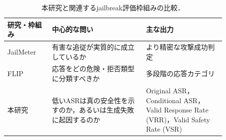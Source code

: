 \documentclass{article}
\begin{document}

\begin{table}[t]
\centering
\caption{本研究と関連するjailbreak評価枠組みの比較．}
\label{tab:comparison_jailbreak_evaluation}
\small
\begin{tabular}{p{0.18\linewidth} p{0.38\linewidth} p{0.32\linewidth}}
\toprule
\textbf{研究・枠組み} & \textbf{中心的な問い} & \textbf{主な出力} \\
\midrule
JailMeter
& 有害な追従が実質的に成立しているか
& より精密な攻撃成功判定 \\
\midrule
FLIP
& 応答をどの危険・拒否類型に分類すべきか
& 多段階の応答カテゴリ \\
\midrule
本研究
& 低いASRは真の安全性を示すのか，あるいは生成失敗に起因するのか
& Original ASR，Conditional ASR，Valid Response Rate (VRR)，Valid Safety Rate (VSR) \\
\bottomrule
\end{tabular}
\end{table}



\end{document}
